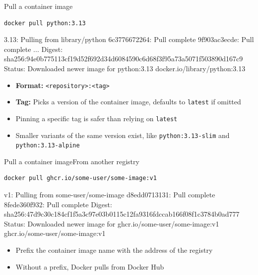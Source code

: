 \documentclass[aspectratio=169]{beamer}
\begin{document}
\begin{frame}[fragile]{Pull a container image}
  \begin{verbatim}
docker pull python:3.13
  \end{verbatim}
  \begin{cmdoutput}
3.13: Pulling from library/python
6c3776672264: Pull complete
9f903ac3ecde: Pull complete
...
Digest: sha256:94e0b775113cf19d52f692d34d6084590c6d68f3f95a73a5071f503890d167c9
Status: Downloaded newer image for python:3.13
docker.io/library/python:3.13
  \end{cmdoutput}

  \begin{itemize}
    \item \textbf{Format:} \texttt{<repository>:<tag>}
    \item \textbf{Tag:} Picks a version of the container image, defaults to \texttt{latest} if omitted
    \item Pinning a specific tag is safer than relying on \texttt{latest}
    \item Smaller variants of the same version exist, like \texttt{python:3.13-slim} and \texttt{python:3.13-alpine}
  \end{itemize}

\note{
}
\end{frame}


\begin{frame}[fragile]{Pull a container image}{From another registry}
  \begin{verbatim}
docker pull ghcr.io/some-user/some-image:v1
  \end{verbatim}
  \begin{cmdoutput}
v1: Pulling from some-user/some-image
d8edd0713131: Pull complete
8fede360f932: Pull complete
Digest: sha256:47d9c30c184cf1f5a3c97e03b0115c12fa9316fdccab166f08f1c3784b0ad777
Status: Downloaded newer image for ghcr.io/some-user/some-image:v1
ghcr.io/some-user/some-image:v1
  \end{cmdoutput}

  \begin{itemize}
    \item Prefix the container image name with the address of the registry
    \item Without a prefix, Docker pulls from Docker Hub
  \end{itemize}

\note{
}
\end{frame}
\end{document}
